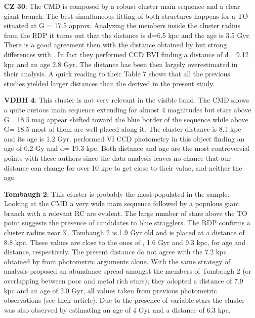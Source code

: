 \documentclass{aa}
\begin{document}
\textbf{CZ 30}: 
The CMD is composed by a robust cluster main sequence and a clear giant branch. The best simultaneous fitting of both structures happens for a TO situated at G = 17.5 approx. Analyzing the members inside the cluster radius from the RDP it turns out that the distance is d=6.5 kpc and the age is 3.5 Gyr. There is a good agreement then with the distance obtained by \cite{Cantat_2020} but strong differences with \cite{2015AJ....150..200H}. In fact they performed CCD BVI finding a distance of d= 9.12 kpc and an age 2.8 Gyr. The distance has been then largely overestimated in their analysis. A quick reading to their Table 7 shows that all the previous studies yielded larger distances than the derived in the present study.

\textbf{VDBH 4}:
This cluster is not very relevant in the visible band. The CMD shows a quite curious main sequence extending for almost 4 magnitudes but stars above G= 18.5 mag appear shifted toward the blue border of the sequence while above G= 18.5 most of them are well placed along it. The cluster distance is 8.1 kpc and its age is 1.2 Gyr. \cite{2007A&A...464..573C} performed VI CCD photometry in this object finding an age of 0.2 Gy and d= 19.3 kpc. Both distance and age are the most controversial points with these authors since the data analysis leaves no chance that our distance can change for over 10 kpc to get close to their value, and neither the age. 

\textbf{Tombaugh 2}: 
This cluster is probably the most populated in the sample. Looking at the CMD a very wide main sequence followed by a populous giant branch with a relevant RC are evident. The large number of stars above the TO point suggests the presence of candidates to blue stragglers. The RDP confirms a cluster radius near 3$^{\prime}$. Tombaugh 2 is 1.9 Gyr old and is placed at a distance of 8.8 kpc. These values are close to the ones of \cite{Cantat_2020}, 1.6 Gyr and 9.3 kpc, for age and distance, respectively. The present distance do not agree with the 7.2 kpc obtained by \cite{2010A&A...509A.102V}  from photometric arguments alone. With the same strategy of analysis \cite{2008MNRAS.391...39F} proposed an abundance spread amongst the members of Tombaugh 2 (or overlapping between poor and metal rich stars); they adopted a distance of 7.9 kpc and an age of 2.0 Gyr, all values taken from previous photometric observations (see their article). Due to the presence of variable stars the cluster was also observed by \cite{1992AcA....42..155K} estimating an age of 4 Gyr and a distance of 6.3 kpc.
\end{document}
